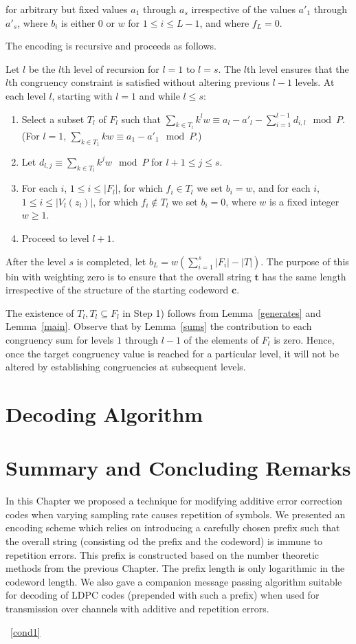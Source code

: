 for arbitrary but fixed values $a_1$ through $a_s$ irrespective of
the values ${a'}_1$ through ${a'}_s$, where $b_i$ is either $0$ or
$w$ for $1 \leq i \leq L-1$, and where $f_L=0$.

The encoding is recursive and proceeds as follows.

Let $l$ be the $l$th level of recursion for $l=1$ to $l=s$. The
$l$th level ensures that the $l$th congruency constraint is
satisfied without altering previous $l-1$ levels.
 At each level $l$, starting with $l=1$ and while $l \leq s$:
\begin{enumerate}
 \item Select a subset $T_{l}$ of $F_l$ such that $\sum_{k \in T_l} k^lw \equiv a_l - {a'}_l -
\sum_{i=1}^{l-1} d_{i,l} \mod P$. (For $l=1$, $\sum_{k \in T_1} kw
\equiv a_1 - {a'}_1 \mod P$.)\item Let $d_{l,j} \equiv \sum_{k \in
T_l} k^jw \mod P$ for $l+1 \leq j\leq s$. \item For each $i$, $1
\leq i \leq |F_l|$, for which $f_i \in T_l$ we set $b_i=w$, and
for each $i$, $1 \leq i \leq |V_l(z_l)|$, for which $f_i \notin
T_l$ we set $b_i=0$, where $w$ is a fixed integer $w \geq 1$.
\item Proceed to level $l+1$.
\end{enumerate}

After the level $s$ is completed, let $b_L=w(\sum_{i=1}^s |F_i|-
|T|)$. The purpose of this bin with weighting zero is to ensure
that the overall string $\mathbf{t}$ has the same length
irrespective of the structure of the starting codeword
$\mathbf{c}$.

The existence of $T_l, T_l \subseteq F_l$ in Step 1) follows from
Lemma~\ref{generates} and Lemma~\ref{main}. Observe that by
Lemma~\ref{sums} the contribution to each congruency sum for
levels $1$ through $l-1$ of the elements of $F_l$ is zero. Hence,
once the target congruency value is reached for a particular
level, it will not be altered by establishing congruencies at
subsequent levels.

\section{Decoding Algorithm}
\section{Summary and Concluding Remarks}

In this Chapter we proposed a technique for modifying additive
error correction codes when varying sampling rate causes
repetition of symbols. We presented an encoding scheme which
relies on introducing a carefully chosen prefix such that the
overall string (consisting od the prefix and the codeword) is
immune to repetition errors. This prefix is constructed based on
the number theoretic methods from the previous Chapter. The prefix
length is only logarithmic in the codeword length. We also gave a
companion message passing algorithm suitable for decoding of LDPC
codes (prepended with such a prefix) when used for transmission
over channels with additive and repetition errors.




~\eqref{cond1}


